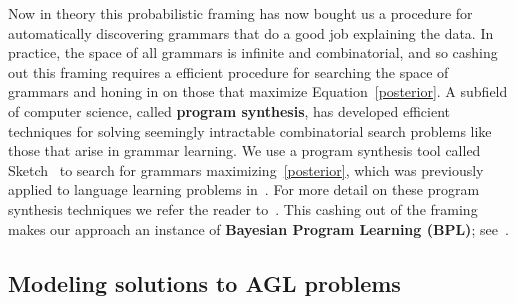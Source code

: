 \documentclass{article}
\begin{document}
Now in theory this probabilistic framing
has now bought us a procedure for automatically discovering
grammars that do a good job explaining the data.
In practice,
the space of all grammars is infinite and combinatorial,
and so cashing out this framing requires a
efficient procedure for searching the space of grammars and honing in on those that maximize Equation~\ref{posterior}.
A subfield of computer science, called \textbf{program synthesis},
has developed efficient techniques for
solving seemingly intractable combinatorial search problems
like those that arise in grammar learning.
We use a program synthesis tool called Sketch~\cite{solar2008program}
to search for grammars maximizing~\ref{posterior},
which was previously applied to language learning problems in~\cite{ellis2015unsupervised}.
For more detail on these program synthesis techniques we refer the reader to~\cite{solar2008program}.
This cashing out of the framing makes
our approach an instance of  \textbf{Bayesian Program Learning (BPL)}; see~\cite{lake2015human}.


\subsection{Modeling solutions to AGL problems}
\end{document}
